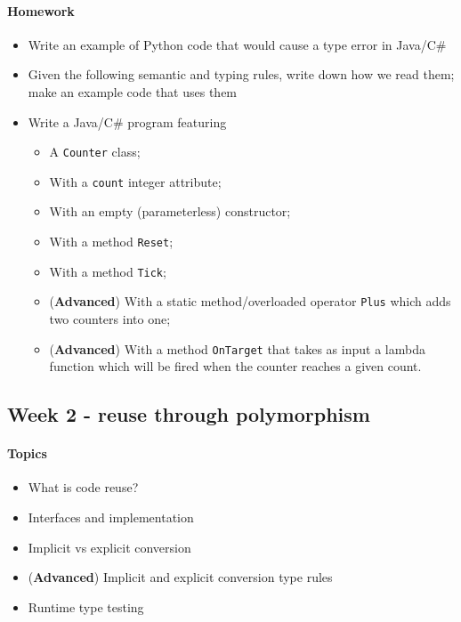 		\paragraph*{Homework}
		\begin{itemize}
			\item Write an example of Python code that would cause a type error in Java/C\#
			\item Given the following semantic and typing rules, write down how we read them; make an example code that uses them
			\item Write a Java/C\# program featuring
			\begin{itemize}
				\item A \texttt{Counter} class;
				\item With a \texttt{count} integer attribute;
				\item With an empty (parameterless) constructor;
				\item With a method \texttt{Reset};
				\item With a method \texttt{Tick};
				\item (\textbf{Advanced}) With a static method/overloaded operator \texttt{Plus} which adds two counters into one;
				\item (\textbf{Advanced}) With a method \texttt{OnTarget} that takes as input a lambda function which will be fired when the counter reaches a given count.
			\end{itemize}
		\end{itemize}
		
		
		
		\subsection{Week 2 - reuse through polymorphism}
		
		\paragraph*{Topics}			
		\begin{itemize}
			\item What is code reuse?
			\item Interfaces and implementation
			\item Implicit vs explicit conversion
			\item (\textbf{Advanced}) Implicit and explicit conversion type rules
			\item Runtime type testing
		\end{itemize}
		
